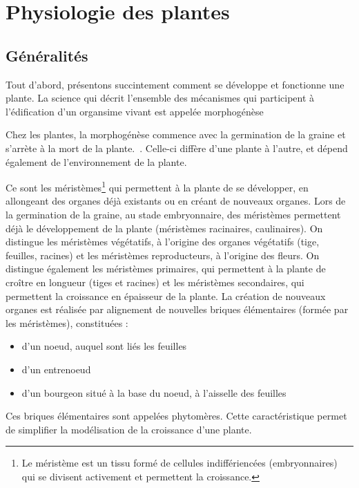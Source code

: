\section{Physiologie des plantes}
\label{ann:physiologie}

\subsection{Généralités}

Tout d'abord, présentons succintement comment se développe et fonctionne une plante. 
La science qui décrit l'ensemble des mécanismes qui participent à l'édification d'un organsime vivant est appelée morphogénèse

Chez les plantes, la morphogénèse commence avec la germination de la graine et s'arrète à la mort de la plante.~\cite[p.~22]{these_modelisation}.
Celle-ci diffère d'une plante à l'autre, et dépend également de l'environnement de la plante.

Ce sont les méristèmes\footnote{Le méristème est un tissu formé de cellules indiffériencées (embryonnaires) qui se divisent activement et permettent la croissance.} qui permettent à la plante de se développer, en allongeant des organes déjà existants ou en créant de nouveaux organes.
Lors de la germination de la graine, au stade embryonnaire, des méristèmes permettent déjà le développement de la plante (méristèmes racinaires, caulinaires).
On distingue les méristèmes végétatifs, à l’origine des organes végétatifs (tige, feuilles, racines) et les méristèmes reproducteurs, à l’origine des fleurs.
On distingue également les méristèmes primaires, qui permettent à la plante de croître en longueur (tiges et racines) et les méristèmes secondaires, qui permettent la croissance en épaisseur de la plante.
La création de nouveaux organes est réalisée par alignement de nouvelles briques élémentaires (formée par les méristèmes), constituées :
\begin{itemize}
	\item d'un noeud, auquel sont liés les feuilles
	\item d'un entrenoeud 
	\item d'un bourgeon situé à la base du noeud, à l'aisselle des feuilles
\end{itemize} 

Ces briques élémentaires sont appelées phytomères. Cette caractéristique permet de simplifier la modélisation de la croissance d'une plante.




